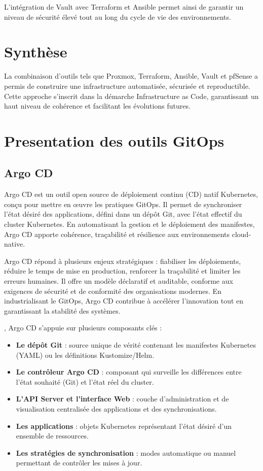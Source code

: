 L’intégration de Vault avec Terraform et Ansible permet ainsi de garantir un niveau de sécurité élevé tout au long du cycle de vie des environnements.

\section{Synthèse}

La combinaison d’outils tels que Proxmox, Terraform, Ansible, Vault et pfSense a permis de construire une infrastructure automatisée, sécurisée et reproductible. Cette approche s’inscrit dans la démarche Infrastructure as Code, garantissant un haut niveau de cohérence et facilitant les évolutions futures.

\section{Presentation des outils GitOps}
\subsection{Argo CD}

Argo CD est un outil open source de déploiement continu (CD) natif Kubernetes, conçu pour mettre en œuvre les pratiques GitOps. Il permet de synchroniser l’état désiré des applications, défini dans un dépôt Git, avec l’état effectif du cluster Kubernetes. En automatisant la gestion et le déploiement des manifestes, Argo CD apporte cohérence, traçabilité et résilience aux environnements cloud-native.

Argo CD répond à plusieurs enjeux stratégiques  : fiabiliser les déploiements, réduire le temps de mise en production, renforcer la traçabilité et limiter les erreurs humaines. Il offre un modèle déclaratif et auditable, conforme aux exigences de sécurité et de conformité des organisations modernes. En industrialisant le GitOps, Argo CD contribue à accélérer l’innovation tout en garantissant la stabilité des systèmes.

, Argo CD s’appuie sur plusieurs composants clés  :
\begin{itemize}
	\item \textbf{Le dépôt Git}  : source unique de vérité contenant les manifestes Kubernetes (YAML) ou les définitions Kustomize/Helm.
	\item \textbf{Le contrôleur Argo CD}  : composant qui surveille les différences entre l’état souhaité (Git) et l’état réel du cluster.
	\item \textbf{L’API Server et l’interface Web}  : couche d’administration et de visualisation centralisée des applications et des synchronisations.
	\item \textbf{Les applications}  : objets Kubernetes représentant l’état désiré d’un ensemble de ressources.
	\item \textbf{Les stratégies de synchronisation}  : modes automatique ou manuel permettant de contrôler les mises à jour.
\end{itemize}

